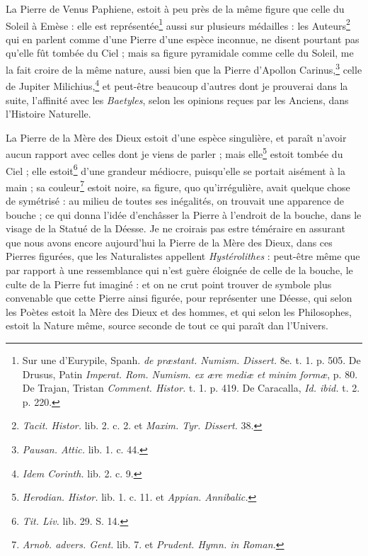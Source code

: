 \documentclass[a4paper, 11pt, oneside, polutonikogreek, french]{article}
\begin{document}
La Pierre de Venus Paphiene, estoit à peu près de la même figure que celle du Soleil à Emèse : elle est représentée\footnote{Sur une d'Eurypile, Spanh. \emph{de præstant. Numism. Dissert.} 8e. t. 1. p. 505. De Drusus, Patin \emph{Imperat. Rom. Numism. ex ære mediæ et minim formæ}, p. 80. De Trajan, Tristan \emph{Comment. Histor.} t. 1. p. 419. De Caracalla, \emph{Id. ibid.} t. 2. p. 220.} aussi sur plusieurs médailles : les Auteurs\footnote{\emph{Tacit. Histor.} lib. 2. c. 2. et \emph{Maxim. Tyr. Dissert.} 38.} qui en parlent comme d'une Pierre d'une espèce inconnue, ne disent pourtant pas qu'elle fût tombée du Ciel ; mais sa figure pyramidale comme celle du Soleil, me la fait croire de la même nature, aussi bien que la Pierre d'Apollon Carinus,\footnote{\emph{Pausan. Attic.} lib. 1. c. 44.} celle de Jupiter Milichius,\footnote{\emph{Idem Corinth.} lib. 2. c. 9.} et peut-être beaucoup d'autres dont je prouverai dans la suite, l'affinité avec les \emph{Baetyles}, selon les opinions reçues par les Anciens, dans l'Histoire Naturelle.

La Pierre de la Mère des Dieux estoit d'une espèce singulière, et paraît n'avoir aucun rapport avec celles dont je viens de parler ; mais elle\footnote{\emph{Herodian. Histor.} lib. 1. c. 11. et \emph{Appian. Annibalic.}} estoit tombée du Ciel ; elle estoit\footnote{\emph{Tit. Liv.} lib. 29. S. 14.} d'une grandeur médiocre, puisqu'elle se portait aisément à la main ; sa couleur\footnote{\emph{Arnob. advers. Gent.} lib. 7. et \emph{Prudent. Hymn. in Roman.}} estoit noire, sa figure, quo qu’irrégulière, avait quelque chose de symétrisé : au milieu de toutes ses inégalités, on trouvait une apparence de bouche ; ce qui donna l'idée d'enchâsser la Pierre à l'endroit de la bouche, dans le visage de la Statué de la Déesse. Je ne croirais pas estre téméraire en assurant que nous avons encore aujourd’hui la Pierre de la Mère des Dieux, dans ces Pierres figurées, que les Naturalistes appellent \emph{Hystérolithes} : peut-être même que par rapport à une ressemblance qui n'est guère éloignée de celle de la bouche, le culte de la Pierre fut imaginé : et on ne crut point trouver de symbole plus convenable que cette Pierre ainsi figurée, pour représenter une Déesse, qui selon les Poètes estoit la Mère des Dieux et des hommes, et qui selon les Philosophes, estoit la Nature même, source seconde de tout ce qui paraît dan l'Univers.
\end{document}
